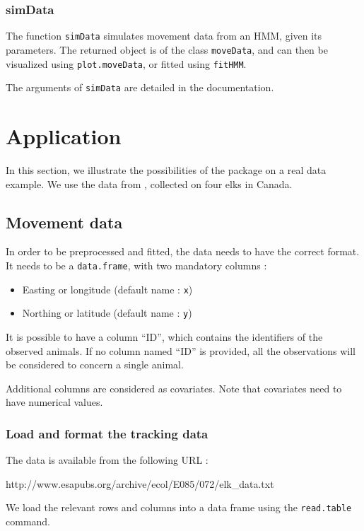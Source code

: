 \documentclass[]{article}
\begin{document}
\subsubsection{simData}
The function \texttt{simData} simulates movement data from an HMM, given its parameters. The returned object is of the class \texttt{moveData}, and can then be visualized using \texttt{plot.moveData}, or fitted using \texttt{fitHMM}.

The arguments of \texttt{simData} are detailed in the documentation.

\section{Application} \label{application}
In this section, we illustrate the possibilities of the package on a real data example. We use the data from \cite{morales2004}, collected on four elks in Canada. 

\subsection{Movement data}
In order to be preprocessed and fitted, the data needs to have the correct format. It needs to be a \texttt{data.frame}, with two mandatory columns :
\begin{itemize}
	\item Easting or longitude (default name : \texttt{x})
	\item Northing or latitude (default name : \texttt{y})
\end{itemize}
It is possible to have a column ``ID'', which contains the identifiers of the observed animals. If no column named ``ID'' is provided, all the observations will be considered to concern a single animal.

Additional columns are considered as covariates. Note that covariates need to have numerical values.\\

\subsubsection{Load and format the tracking data}

The data is available from the following URL : 
\begin{center}
	http://www.esapubs.org/archive/ecol/E085/072/elk\_data.txt
\end{center}
We load the relevant rows and columns into a data frame using the \texttt{read.table} command.
\end{document}
